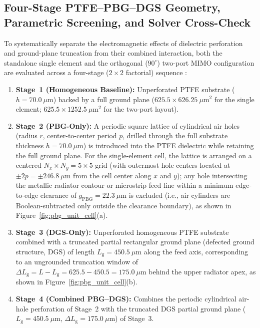 \documentclass[referee,pdflatex,sn-mathphys-ay]{sn-jnl}
\begin{document}

\subsection{Four-Stage PTFE--PBG--DGS Geometry, Parametric Screening, and Solver Cross-Check}
\label{subsec:ptfe_pbg_design}
\label{subsec:single_element_validation}

To systematically separate the electromagnetic effects of dielectric perforation and ground-plane truncation from their combined interaction, both the standalone single element and the orthogonal ($90^{\circ}$) two-port MIMO configuration are evaluated across a four-stage ($2 \times 2$ factorial) sequence \citep{gonzalo1999pbg, coccioli1999ucpbg, zaidi2018pbg, jha2012thz}:
\begin{enumerate}
    \item \textbf{Stage~1 (Homogeneous Baseline):} Unperforated PTFE substrate ($h = 70.0~\mu\mathrm{m}$) backed by a full ground plane ($625.5 \times 626.25~\mu\mathrm{m}^2$ for the single element; $625.5 \times 1252.5~\mu\mathrm{m}^2$ for the two-port layout).
    \item \textbf{Stage~2 (PBG-Only):} A periodic square lattice of cylindrical air holes (radius $r$, center-to-center period $p$, drilled through the full substrate thickness $h = 70.0~\mu\mathrm{m}$) is introduced into the PTFE dielectric while retaining the full ground plane. For the single-element cell, the lattice is arranged on a centered $N_x \times N_y = 5 \times 5$ grid (with outermost hole centers located at $\pm 2p = \pm 246.8~\mu\mathrm{m}$ from the cell center along $x$ and $y$); any hole intersecting the metallic radiator contour or microstrip feed line within a minimum edge-to-edge clearance of $g_{\mathrm{PBG}} = 22.3~\mu\mathrm{m}$ is excluded (i.e., air cylinders are Boolean-subtracted only outside the clearance boundary), as shown in Figure~\ref{fig:pbg_unit_cell}(a).
    \item \textbf{Stage~3 (DGS-Only):} Unperforated homogeneous PTFE substrate combined with a truncated partial rectangular ground plane (defected ground structure, DGS) of length $L_{\mathrm{g}} = 450.5~\mu\mathrm{m}$ along the feed axis, corresponding to an ungrounded truncation window of $\Delta L_{\mathrm{g}} = L - L_{\mathrm{g}} = 625.5 - 450.5 = 175.0~\mu\mathrm{m}$ behind the upper radiator apex, as shown in Figure~\ref{fig:pbg_unit_cell}(b).
    \item \textbf{Stage~4 (Combined PBG--DGS):} Combines the periodic cylindrical air-hole perforation of Stage~2 with the truncated DGS partial ground plane ($L_{\mathrm{g}} = 450.5~\mu\mathrm{m}$, $\Delta L_{\mathrm{g}} = 175.0~\mu\mathrm{m}$) of Stage~3.
\end{enumerate}
\end{document}
